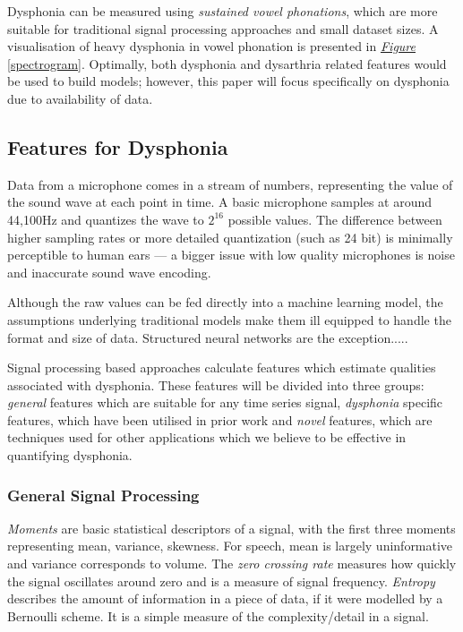 \documentclass{article}
\begin{document}


Dysphonia can be measured using \emph{sustained vowel phonations}, which are more suitable for traditional signal processing approaches and small dataset sizes. A visualisation of heavy dysphonia in vowel phonation is presented in \textit{\hyperref[spectrogram]{Figure}} \ref{spectrogram}. Optimally, both dysphonia and dysarthria related features would be used to build models; however, this paper will focus specifically on dysphonia due to availability of data.

\subsection{Features for Dysphonia}
Data from a microphone comes in a stream of numbers, representing the value of the sound wave at each point in time. A basic microphone samples at around 44,100Hz and quantizes the wave to $2^16$ possible values. The difference between higher sampling rates or more detailed quantization (such as 24 bit) is minimally perceptible to human ears --- a bigger issue with low quality microphones is noise and inaccurate sound wave encoding.

Although the raw values can be fed directly into a machine learning model, the assumptions underlying traditional models make them ill equipped to handle the format and size of data. Structured neural networks are the exception.....


Signal processing based approaches calculate features which estimate qualities associated with dysphonia. These features will be divided into three groups: \emph{general} features which are suitable for any time series signal, \emph{dysphonia} specific features, which have been utilised in prior work and \emph{novel} features, which are techniques used for other applications which we believe to be effective in quantifying dysphonia.

 
\subsubsection{General Signal Processing}
\emph{Moments} are basic statistical descriptors of a signal, with the first three moments representing mean, variance, skewness. For speech, mean is largely uninformative and variance corresponds to volume. The \emph{zero crossing rate} measures how quickly the signal oscillates around zero and is a measure of signal frequency. \emph{Entropy} describes the amount of information in a piece of data, if it were modelled by a Bernoulli scheme. It is a simple measure of the complexity/detail in a signal. 
\end{document}
